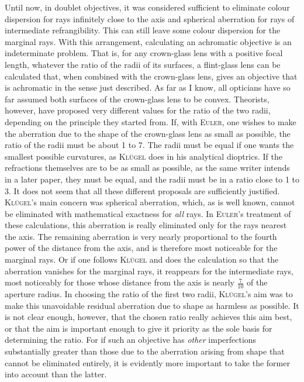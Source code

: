 Until now, in doublet objectives, it was considered sufficient to eliminate colour dispersion for rays infinitely close to the axis and spherical aberration for rays of intermediate refrangibility. This can still leave some colour dispersion for the marginal rays. With this arrangement, calculating an achromatic objective is an indeterminate problem. That is, for any crown-glass lens with a positive focal length, whatever the ratio of the radii of its surfaces, a flint-glass lens can be calculated that, when combined with the crown-glass lens, gives an objective that is achromatic in the sense just described. As far as I know, all opticians have so far assumed both surfaces of the crown-glass lens to be convex. Theorists, however, have proposed very different values for the ratio of the two radii, depending on the principle they started from. If, with \textsc{Euler}, one wishes to make the aberration due to the shape of the crown-glass lens as small as possible, the ratio of the radii must be about
1 to 7. The radii must be equal if one wants the smallest possible curvatures, as \textsc{Klügel} does in his analytical dioptrics. If the refractions themselves are to be as small as possible, as the same writer intends in a later paper, they must be equal, and the radii must be in a ratio close to 1 to 3. It does not seem that all these different proposals are sufficiently justified. \textsc{Klügel}'s main concern was spherical aberration, which, as is well known, cannot be eliminated with mathematical exactness for \textit{all} rays. In \textsc{Euler}'s treatment of these calculations, this aberration is really eliminated only for the rays nearest the axis. The remaining aberration is very nearly proportional to the fourth power of the distance from the axis, and is therefore most noticeable for the marginal rays. Or if one follows \textsc{Klügel} and does the calculation so that the aberration vanishes for the marginal rays, it reappears for the intermediate rays, most noticeably for those whose distance from the axis is nearly $\tfrac{7}{10}$ of the aperture radius. In choosing the ratio of the first two radii, \textsc{Klügel}'s aim was to make this unavoidable residual aberration due to shape as harmless as possible. It is not clear enough, however, that the chosen ratio really achieves this aim best, or that the aim is important enough to give it priority as the sole basis for determining the ratio. For if such an objective has \textit{other} imperfections substantially greater than those due to the aberration arising from shape that cannot be eliminated entirely, it is evidently more important to take the former into account than the latter.

